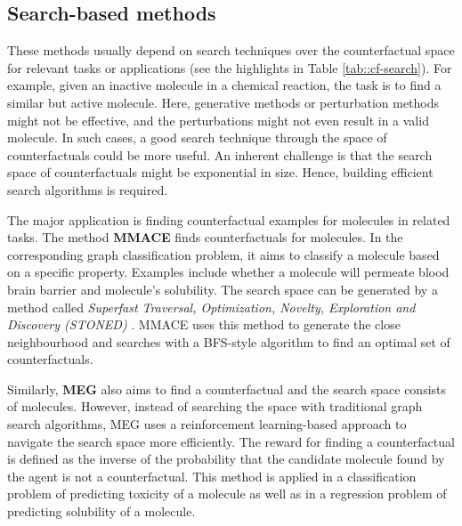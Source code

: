 
\subsection{Search-based methods}
\label{sec:sourav_:Counterfactual-search}
These methods usually depend on search techniques over the counterfactual space for relevant tasks or applications (see the highlights in Table \ref{tab::cf-search}). For example, given an inactive molecule in a chemical reaction, the task is to find a similar but active molecule. Here, generative methods or perturbation methods might not be effective, and the perturbations might not even result in a valid molecule. In such cases, a good search technique through the space of counterfactuals could be more useful. An inherent challenge is that the search space of counterfactuals might be exponential in size. Hence, building efficient search algorithms is required.



The major application is finding counterfactual examples for molecules in related tasks. The method \textbf{MMACE} \cite{agnostic-counter} finds counterfactuals for molecules.
In the corresponding graph classification problem, it aims to classify a molecule based on a specific property. Examples include whether a molecule will permeate blood brain barrier and molecule's solubility.
The search space can be generated by a method called \textit{Superfast Traversal, Optimization, Novelty, Exploration and Discovery (STONED)} \cite{nigam2021beyond}. MMACE uses this method to generate the close neighbourhood and searches with a BFS-style algorithm to find an optimal set of counterfactuals.



Similarly, \textbf{MEG} \cite{meg-counter} also aims to find a counterfactual and the search space consists of molecules. However, instead of searching the space with traditional graph search algorithms, MEG uses a reinforcement learning-based approach to navigate the search space more efficiently. The reward for finding a counterfactual is defined as the inverse of the probability that the candidate molecule found by the agent is not a counterfactual. This method is applied in a classification problem of predicting toxicity of a molecule as well as in a regression problem of predicting solubility of a molecule.

